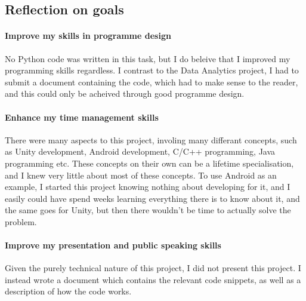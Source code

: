     \subsection{Reflection on goals}
        \paragraph{Improve my skills in programme design} No Python code was written in this task, but I do beleive that I improved my programming skills regardless. I contrast to the Data Analytics project, I had to submit a document containing the code, which had to make sense to the reader, and this could only be acheived through good programme design.

        \paragraph{Enhance my time management skills} There were many aspects to this project, involing many differant concepts, such as Unity development, Android development, C/C++ programming, Java programming etc. These concepts on their own can be a lifetime specialisation, and I knew very little about most of these concepts. To use Android as an example, I started this project knowing nothing about developing for it, and I easily could have spend weeks learning everything there is to know about it, and the same goes for Unity, but then there wouldn't be time to actually solve the problem.

        \paragraph{Improve my presentation and public speaking skills} Given the purely technical nature of this project, I did not present this project. I instead wrote a document which contains the relevant code snippets, as well as a description of how the code works.
